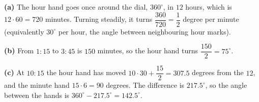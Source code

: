 \textbf{(a)} The hour hand goes once around the dial, $360^\circ$, in $12$ hours, which is $12\cdot60=720$ minutes. Turning steadily, it turns $\dfrac{360}{720}=\dfrac12$ degree per minute (equivalently $30^\circ$ per hour, the angle between neighbouring hour marks).

\textbf{(b)} From $1{:}15$ to $3{:}45$ is $150$ minutes, so the hour hand turns $\dfrac{150}{2}=\boxed{75^\circ}$.

\textbf{(c)} At $10{:}15$ the hour hand has moved $10\cdot30+\dfrac{15}{2}=307.5$ degrees from the $12$, and the minute hand $15\cdot6=90$ degrees. The difference is $217.5^\circ$, so the angle between the hands is $360^\circ-217.5^\circ=\boxed{142.5^\circ}$.
